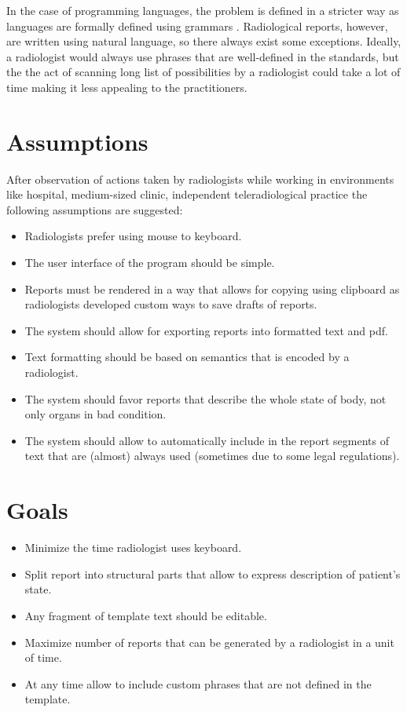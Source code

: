 \documentclass[12pt, twoside, openany]{report}
\theoremstyle{definition}
\begin{document}
In the case of programming languages, the problem is defined in a stricter way as languages are formally defined using grammars \cite{csharp-spec}. Radiological reports, however, are written using  natural language, so there always exist some exceptions. Ideally, a radiologist would always use phrases that are well-defined in the standards, but the the act of scanning long list of possibilities by a radiologist could take a lot of time making it less appealing to the practitioners.


\section{Assumptions}
After observation of actions taken by radiologists while working in environments like hospital, medium-sized clinic, independent teleradiological practice the following assumptions are suggested:
\begin{itemize}
	\item Radiologists prefer using mouse to keyboard.
	\item The user interface of the program should be simple.
	\item Reports must be rendered in a way that allows for copying using clipboard as radiologists developed custom ways to save drafts of reports.
	\item The system should allow for exporting reports into formatted text and pdf.
	\item Text formatting should be based on semantics that is encoded by a radiologist.
	\item The system should favor reports that describe the whole state of body, not only organs in bad condition.
	\item The system should allow to automatically include in the report segments of text that are (almost) always used (sometimes due to some legal regulations).
	
\end{itemize}
\section{Goals}
\begin{itemize}
	\item Minimize the time radiologist uses keyboard.
	\item Split report into structural parts that allow to express description of patient's state.
	\item Any fragment of template text should be editable. 
	\item Maximize number of reports that can be generated by a radiologist in a unit of time.
	\item At any time allow to include custom phrases that are not defined in the template.
\end{itemize}
\end{document}
